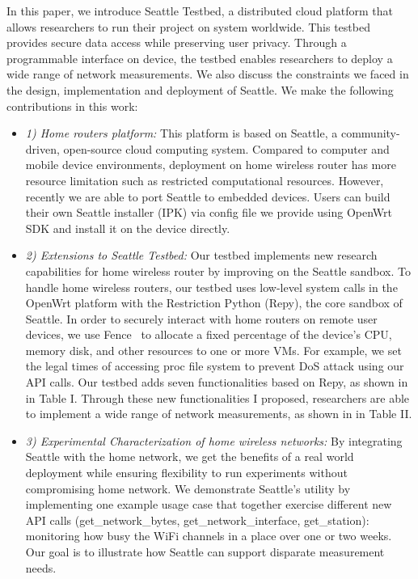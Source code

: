 In this paper, we introduce Seattle Testbed, a distributed cloud platform 
that allows researchers to run their project on system worldwide. This 
testbed provides secure data access while preserving user privacy. Through a 
programmable interface on device, the testbed enables researchers to deploy 
a wide range of network measurements. We also discuss the constraints we 
faced in the design, implementation and deployment of Seattle.
We make the following contributions in this work:
\begin{itemize}
\item\textit{1) Home routers platform:} This platform is based on Seattle\cite{zhuang2013experience}, a community-driven, open-source cloud computing system. Compared to computer and mobile device environments, deployment on home wireless router has more resource limitation such as restricted computational resources. However, recently we are able to port Seattle to embedded devices. Users can build their own Seattle installer (IPK) via config file we provide using OpenWrt SDK and install it on the device directly. 
\item\textit{2) Extensions to Seattle Testbed:}  Our testbed implements new research capabilities for home wireless router by improving on the Seattle sandbox. To handle home wireless routers, our testbed uses low-level system calls in the OpenWrt platform\cite{openwrt} with the Restriction Python (Repy)\cite{cappos2010retaining}, the core sandbox of Seattle. In order to securely interact with home routers on remote user devices, we use Fence~\cite{li2015fence} to allocate a fixed percentage of the device's CPU, memory disk, and other resources to one or more VMs. For example, we set the legal times of accessing proc file system to prevent DoS attack using our API calls. Our testbed adds seven functionalities based on Repy, as shown in in Table I. Through these new functionalities I proposed, researchers are able to implement a wide range of network measurements, as shown in in Table II.
\item\textit{3) Experimental Characterization of home wireless networks: } By integrating Seattle with the home network, we get the benefits of a real world deployment while ensuring flexibility to run experiments without compromising home network. We demonstrate Seattle's utility by implementing one example usage case that together exercise different new API calls (get\_network\_bytes, get\_network\_interface, get\_station): monitoring how busy the WiFi channels in a place over one or two weeks. Our goal is to illustrate how Seattle can support disparate measurement needs.
\end{itemize}
